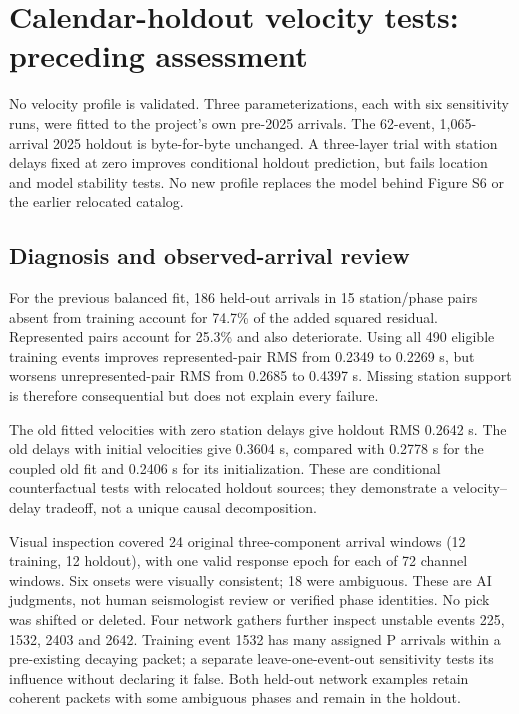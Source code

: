 \section*{Calendar-holdout velocity tests: preceding assessment}
No velocity profile is validated. Three parameterizations, each with six sensitivity runs, were fitted to the project's own pre-2025 arrivals. The 62-event, 1,065-arrival 2025 holdout is byte-for-byte unchanged. A three-layer trial with station delays fixed at zero improves conditional holdout prediction, but fails location and model stability tests. No new profile replaces the model behind Figure S6 or the earlier relocated catalog.

\subsection*{Diagnosis and observed-arrival review}
For the previous balanced fit, 186 held-out arrivals in 15 station/phase pairs absent from training account for 74.7\% of the added squared residual. Represented pairs account for 25.3\% and also deteriorate. Using all 490 eligible training events improves represented-pair RMS from 0.2349 to 0.2269 s, but worsens unrepresented-pair RMS from 0.2685 to 0.4397 s. Missing station support is therefore consequential but does not explain every failure.

The old fitted velocities with zero station delays give holdout RMS 0.2642 s. The old delays with initial velocities give 0.3604 s, compared with 0.2778 s for the coupled old fit and 0.2406 s for its initialization. These are conditional counterfactual tests with relocated holdout sources; they demonstrate a velocity--delay tradeoff, not a unique causal decomposition.

Visual inspection covered 24 original three-component arrival windows (12 training, 12 holdout), with one valid response epoch for each of 72 channel windows. Six onsets were visually consistent; 18 were ambiguous. These are AI judgments, not human seismologist review or verified phase identities. No pick was shifted or deleted. Four network gathers further inspect unstable events 225, 1532, 2403 and 2642. Training event 1532 has many assigned P arrivals within a pre-existing decaying packet; a separate leave-one-event-out sensitivity tests its influence without declaring it false. Both held-out network examples retain coherent packets with some ambiguous phases and remain in the holdout.

